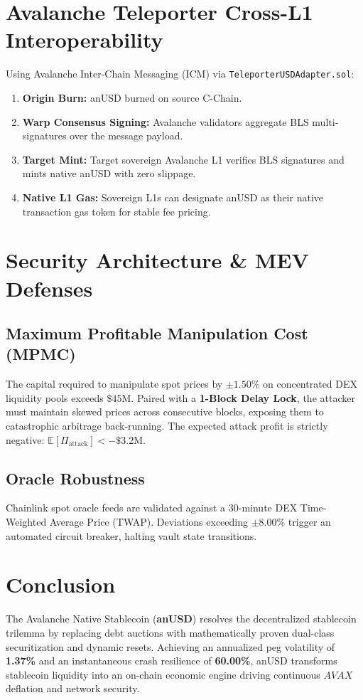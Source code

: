 \documentclass[10pt,journal,compsoc]{IEEEtran}
\begin{document}
\section{Avalanche Teleporter Cross-L1 Interoperability}
Using Avalanche Inter-Chain Messaging (ICM) via \texttt{TeleporterUSDAdapter.sol}:
\begin{enumerate}
    \item \textbf{Origin Burn:} anUSD burned on source C-Chain.
    \item \textbf{Warp Consensus Signing:} Avalanche validators aggregate BLS multi-signatures over the message payload.
    \item \textbf{Target Mint:} Target sovereign Avalanche L1 verifies BLS signatures and mints native anUSD with zero slippage.
    \item \textbf{Native L1 Gas:} Sovereign L1s can designate anUSD as their native transaction gas token for stable fee pricing.
\end{enumerate}

\section{Security Architecture \& MEV Defenses}
\subsection{Maximum Profitable Manipulation Cost (MPMC)}
The capital required to manipulate spot prices by $\pm 1.50\%$ on concentrated DEX liquidity pools exceeds $\$45\text{M}$. Paired with a \textbf{1-Block Delay Lock}, the attacker must maintain skewed prices across consecutive blocks, exposing them to catastrophic arbitrage back-running. The expected attack profit is strictly negative: $\mathbb{E}[\Pi_{\text{attack}}] < -\$3.2\text{M}$.

\subsection{Oracle Robustness}
Chainlink spot oracle feeds are validated against a 30-minute DEX Time-Weighted Average Price (TWAP). Deviations exceeding $\pm 8.00\%$ trigger an automated circuit breaker, halting vault state transitions.

\section{Conclusion}
The Avalanche Native Stablecoin (\textbf{anUSD}) resolves the decentralized stablecoin trilemma by replacing debt auctions with mathematically proven dual-class securitization and dynamic resets. Achieving an annualized peg volatility of \textbf{1.37\%} and an instantaneous crash resilience of \textbf{60.00\%}, anUSD transforms stablecoin liquidity into an on-chain economic engine driving continuous $AVAX$ deflation and network security.
\end{document}
